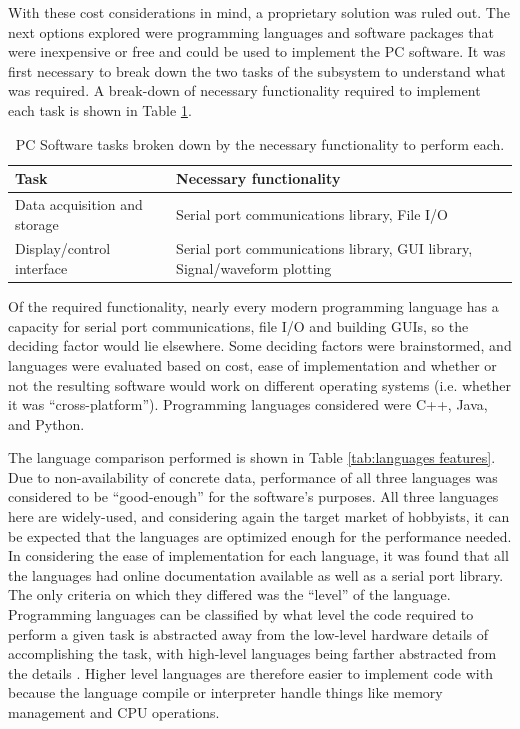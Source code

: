 With these cost considerations in mind, a proprietary solution was ruled out. 
The next options explored were programming languages and software packages that 
were inexpensive or free and could be used to implement the PC software. It was 
first necessary to break down the two tasks of the subsystem to understand what 
was required. A break-down of necessary functionality required to implement each
 task is shown in Table \ref{tab:required functionality}.


\begin{table}[bhp]
\begin{tabular}{l | p{7cm}}
	Task & Necessary functionality \\ \hline
	Data acquisition and storage & Serial port communications library, File I/O \\ \hline
	Display/control interface & Serial port communications library, GUI library, 
	Signal/waveform plotting
\end{tabular}
\caption[Software functionality]{PC Software tasks broken down by the necessary 
functionality to perform each.}
\label{tab:required functionality}
\end{table}


Of the required functionality, nearly every modern programming language has a 
capacity for serial port communications, file I/O and building GUIs, so the deciding 
factor would lie elsewhere. Some deciding factors were brainstormed, and languages were 
evaluated based on cost, ease of implementation and whether or not the resulting 
software would work on different operating systems (i.e. whether it was ``cross-platform'').  
Programming languages considered were C++, Java, and Python. 

The language comparison performed is shown in Table \ref{tab:languages features}. 
Due to non-availability of concrete data, performance of all three languages was 
considered to be ``good-enough'' for the software's purposes. All three languages here are 
widely-used, and considering again the target market of hobbyists, it can be expected 
that the languages are optimized enough for the performance needed. In considering the 
ease of implementation for each language, it was found that all the languages had online 
documentation available as well as a serial port library. The only criteria on which they
differed was the ``level'' of the language. Programming languages can be classified by what 
level the code required to perform a given task is abstracted away from the low-level 
hardware details of accomplishing the task, with high-level languages being farther 
abstracted from the details \cite{web:suranathesis}. Higher level languages are therefore 
easier to implement code with because the language compile or interpreter handle things 
like memory management and CPU operations.


